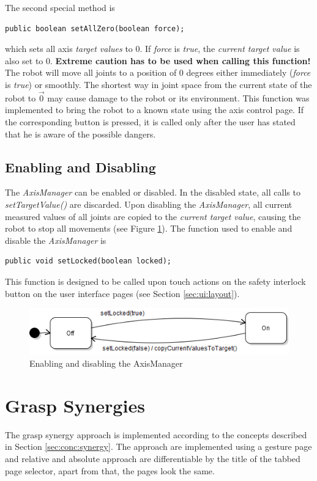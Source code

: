 The second special method is
\begin{lstlisting}
public boolean setAllZero(boolean force);
\end{lstlisting}
which sets all axis \textit{target values} to 0. If \textit{force} is \textit{true}, the \textit{current target value} is also set to 0. \textbf{Extreme caution has to be used when calling this function!} The robot will move all joints to a position of 0 degrees either immediately (\textit{force} is \textit{true}) or smoothly. The shortest way in joint space from the current state of the robot to $\vec{0}$ may cause damage to the robot or its environment. This function was implemented to bring the robot to a known state using the axis control page. If the corresponding button is pressed, it is called only after the user has stated that he is aware of the possible dangers.

\subsection{Enabling and Disabling}

The \textit{AxisManager} can be enabled or disabled. In the disabled state, all calls to \textit{setTargetValue()} are discarded. Upon disabling the \textit{AxisManager}, all current measured values of all joints are copied to the \textit{current target value}, causing the robot to stop all movements (see Figure \ref{fig:impl:axisonoff}). The function used to enable and disable the \textit{AxisManager} is
\begin{lstlisting}
public void setLocked(boolean locked);
\end{lstlisting}

This function is designed to be called upon touch actions on the safety interlock button on the user interface pages (see Section \ref{sec:ui:layout}).

\begin{figure}
	\caption{\label{fig:impl:axisonoff}Enabling and disabling the AxisManager}
	\includegraphics[width=0.75\linewidth]{assets/chpt_impl/sw/AxisManager_onoff}
\end{figure}

\section{Grasp Synergies}
The grasp synergy approach is implemented according to the concepts described in Section \ref{sec:conc:synergy}. The approach are implemented using a gesture page and relative and absolute approach are differentiable by the title of the tabbed page selector, apart from that, the pages look the same.

